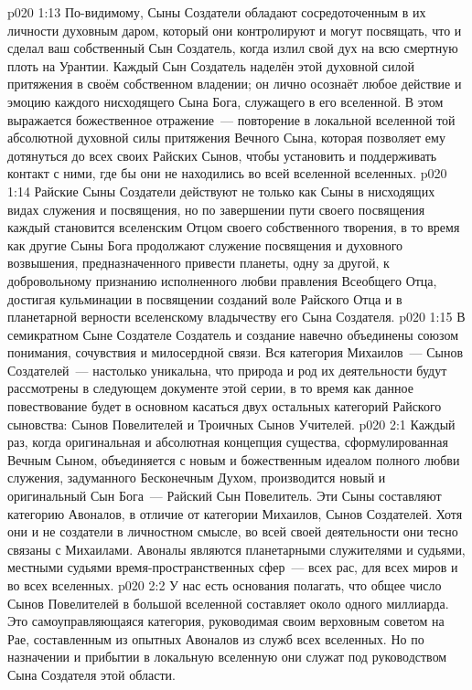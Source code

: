 \vs p020 1:13 По\hyp{}видимому, Сыны Создатели обладают сосредоточенным в их личности духовным даром, который они контролируют и могут посвящать, что и сделал ваш собственный Сын Создатель, когда излил свой дух на всю смертную плоть на Урантии. Каждый Сын Создатель наделён этой духовной силой притяжения в своём собственном владении; он лично осознаёт любое действие и эмоцию каждого нисходящего Сына Бога, служащего в его вселенной. В этом выражается божественное отражение~--- повторение в локальной вселенной той абсолютной духовной силы притяжения Вечного Сына, которая позволяет ему дотянуться до всех своих Райских Сынов, чтобы установить и поддерживать контакт с ними, где бы они не находились во всей вселенной вселенных.
\vs p020 1:14 Райские Сыны Создатели действуют не только как Сыны в нисходящих видах служения и посвящения, но по завершении пути своего посвящения каждый становится вселенским Отцом своего собственного творения, в то время как другие Сыны Бога продолжают служение посвящения и духовного возвышения, предназначенного привести планеты, одну за другой, к добровольному признанию исполненного любви правления Всеобщего Отца, достигая кульминации в посвящении созданий воле Райского Отца и в планетарной верности вселенскому владычеству его Сына Создателя.
\vs p020 1:15 В семикратном Сыне Создателе Создатель и создание навечно объединены союзом понимания, сочувствия и милосердной связи. Вся категория Михаилов~--- Сынов Создателей~--- настолько уникальна, что природа и род их деятельности будут рассмотрены в следующем документе этой серии, в то время как данное повествование будет в основном касаться двух остальных категорий Райского сыновства: Сынов Повелителей и Троичных Сынов Учителей.
\vs p020 2:1 Каждый раз, когда оригинальная и абсолютная концепция существа, сформулированная Вечным Сыном, объединяется с новым и божественным идеалом полного любви служения, задуманного Бесконечным Духом, производится новый и оригинальный Сын Бога~--- Райский Сын Повелитель. Эти Сыны составляют категорию Авоналов, в отличие от категории Михаилов, Сынов Создателей. Хотя они и не создатели в личностном смысле, во всей своей деятельности они тесно связаны с Михаилами. Авоналы являются планетарными служителями и судьями, местными судьями время\hyp{}пространственных сфер~--- всех рас, для всех миров и во всех вселенных.
\vs p020 2:2 У нас есть основания полагать, что общее число Сынов Повелителей в большой вселенной составляет около одного миллиарда. Это самоуправляющаяся категория, руководимая своим верховным советом на Рае, составленным из опытных Авоналов из служб всех вселенных. Но по назначении и прибытии в локальную вселенную они служат под руководством Сына Создателя этой области.

